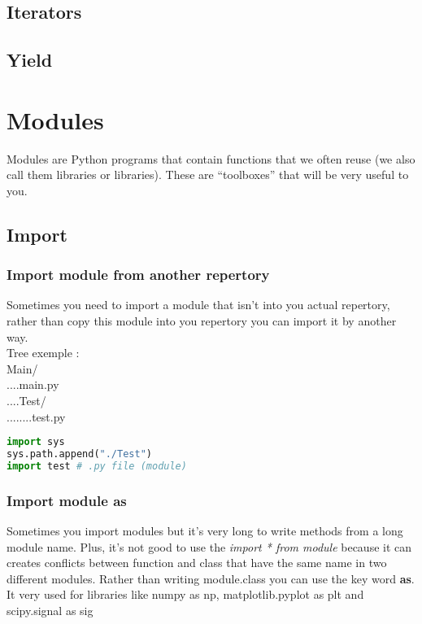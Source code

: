 \documentclass[a4paper, 12pt, titlepage]{scrartcl} %
\begin{document}
\subsection{Iterators}
\subsection{Yield}

\newpage
\section{Modules}
Modules are Python programs that contain functions that we often reuse (we also call them libraries or libraries). These are “toolboxes” that will be very useful to you.\newline

\subsection{Import}
\label{subsec:Import}
\subsubsection{Import module from another repertory}
Sometimes you need to import a module that isn't into you actual repertory, rather than copy this module into you repertory you can import it by another way. \\

Tree exemple : \\
Main/ \\
....main.py \\
....Test/ \\
........test.py \\

\begin{lstlisting}[language=Python]
import sys
sys.path.append("./Test")
import test # .py file (module)
\end{lstlisting}

\subsubsection{Import module as}
Sometimes you import modules but it's very long to write methods from a long module name. Plus, it's not good to use the \textit{import * from module} because it can creates conflicts between function and class that have the same name in two different modules. Rather than writing module.class you can use the key word \textbf{as}. It very used for libraries like numpy as np, matplotlib.pyplot as plt and scipy.signal as sig
\label{As}
\end{document}
